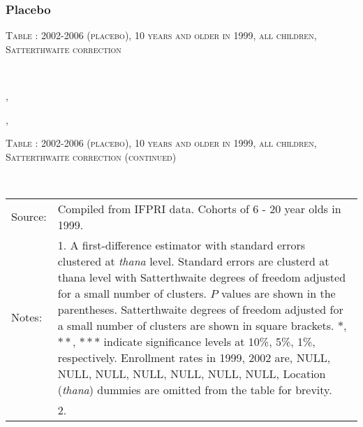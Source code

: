 \clearpage
\subsubsection{Placebo}


\begin{table}\hfil\textsc{\footnotesize Table \thetable:  2002-2006 (placebo), 10 years and older in 1999, all children, Satterthwaite correction\label{zEm.1999.10.sameN}}\\\setlength{\tabcolsep}{1pt}\renewcommand{\arraystretch}{.675}\hspace{-2em}\hfil{}\\\renewcommand{\arraystretch}{1}\end{table}, \addtocounter{table}{-1}, \begin{table}\hfil\textsc{\footnotesize Table \thetable:  2002-2006 (placebo), 10 years and older in 1999, all children, Satterthwaite correction (continued)\label{zEm.1999.10.sameN}}\\\setlength{\tabcolsep}{1pt}\renewcommand{\arraystretch}{.675}\hspace{-2em}\hfil{}\\\renewcommand{\arraystretch}{1}\hfil\begin{tabular}{>{\hfill\scriptsize}p{1cm}<{}>{\scriptsize}p{12cm}<{\hfill}} Source:& Compiled from IFPRI data. Cohorts of 6 - 20 year olds in 1999. \\[-1ex] Notes:& 1. A first-difference estimator with standard errors clustered at \textit{thana} level. Standard errors are clusterd at thana level with Satterthwaite degrees of freedom adjusted for a small number of clusters. $P$ values are shown in the parentheses. Satterthwaite degrees of freedom adjusted for a small number of clusters are shown in square brackets. $*$, $**$, $***$ indicate significance levels at 10\%, 5\%, 1\%, respectively. Enrollment rates in 1999, 2002 are, NULL, NULL, NULL, NULL, NULL, NULL, NULL, Location (\textit{thana}) dummies are omitted from the table for brevity. \\ & 2.   \end{tabular} \end{table}
